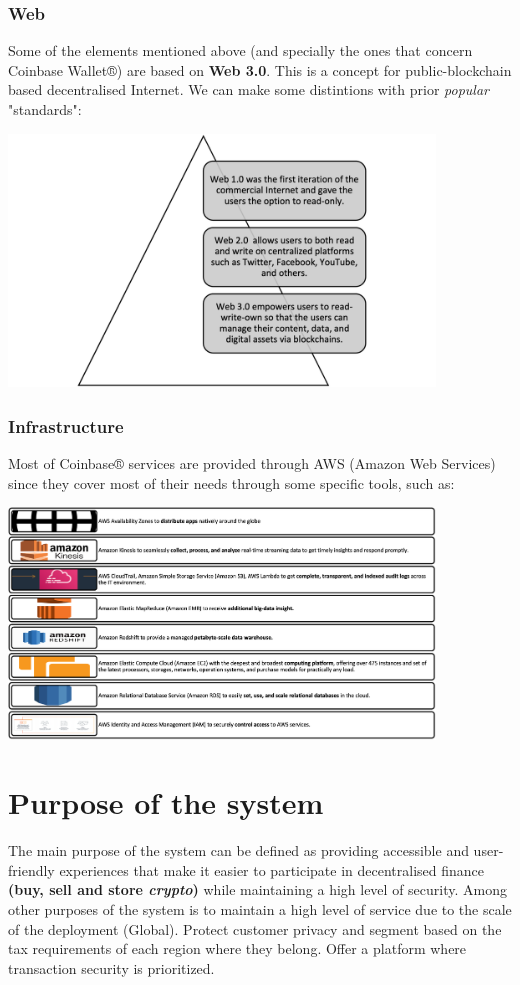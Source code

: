 \documentclass[12pt,a4paper]{article}
\begin{document}
\subsubsection{Web}
Some of the elements mentioned above (and specially the ones that concern Coinbase Wallet®) are based on\textbf{ Web 3.0}.
This is a concept for public-blockchain based decentralised Internet.
We can make some distintions with prior \textit{popular} "standards":
\begin{center}
    \includegraphics[width=0.85\textwidth]{figures/Picture2.png} 
\end{center}
\subsubsection{Infrastructure}
Most of Coinbase® services are provided through AWS (Amazon Web Services) since they cover most of their needs through some specific tools, such as: 
\begin{center}
    \includegraphics[width=0.85\textwidth]{figures/Picture3.png} 
\end{center}
\clearpage
\section{Purpose of the system}
The main purpose of the system can be defined as providing accessible and user-friendly experiences that make it easier to participate in decentralised finance\textbf{ (buy, sell and store \textit{crypto}) } while maintaining a high level of security.
Among other purposes of the system is to maintain a high level of service due to the scale of the deployment (Global). Protect customer privacy and segment based on the tax requirements of each region where they belong. Offer a platform where transaction security is prioritized.
\end{document}
